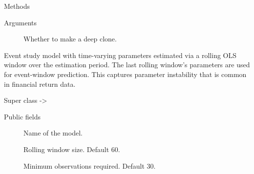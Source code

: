 \documentclass[a4paper]{book}
\begin{document}
\begin{Section}{Methods}
\begin{SubSection}{}

%
\begin{SubSubSection}{Arguments}

\begin{description}

\item[] Whether to make a deep clone.

\end{description}



\end{SubSubSection}

\end{SubSection}


\end{Section}
%
\begin{Description}
Event study model with time-varying parameters estimated via a rolling
OLS window over the estimation period. The last rolling window's
parameters are used for event-window prediction. This captures parameter
instability that is common in financial return data.
\end{Description}
%
\begin{Section}{Super class}
 -> 
\end{Section}
%
\begin{Section}{Public fields}

\begin{description}

\item[] Name of the model.

\item[] Rolling window size. Default 60.

\item[] Minimum observations required. Default 30.

\end{description}


\end{Section}
%
\end{document}
